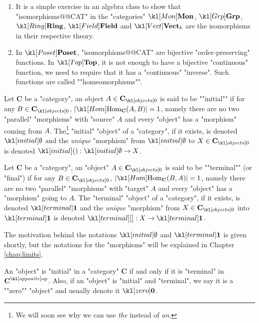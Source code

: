 \documentclass[main.tex]{subfiles}
\begin{document}
\begin{exmps}
	\begin{enumerate}
		\item It is a simple exercise in an algebra class to show that "isomorphisms@@CAT" in the "categories" $\catMon$, $\catGrp$, $\catRing$, $\catField$ and $\catVect{k}$ are the isomorphisms in their respective theory.
		\item In $\catPoset$, "isomorphisms@@CAT" are bijective "order-preserving" functions.
		\itemAP In $\catTop$, it is not enough to have a bijective "continuous" function, we need to require that it has a "continuous" "inverse". Such functions are called ""homeomorphisms"". %
	\end{enumerate}
\end{exmps}
\begin{defn}
	\AP Let $\mathbf{C}$ be a "category", an object $A \in \obj{\mathbf{C}}$ is said to be ""initial"" if for any $B \in \obj{\mathbf{C}}$, $|\Hom_{\mathbf{C}}(A,B)| = 1$, namely there are no two "parallel" "morphisms" with "source" $A$ and every "object" has a "morphism" coming from $A$. The\footnote{We will soon see why we can use \textit{the} instead of \textit{an}.} "initial" "object" of a "category", if it exists, is denoted $\initial$ and the \textit{unique} "morphism" from $\initial$ to $X\in \obj{\mathbf{C}}$ is denoted $\initmorph: \initial \rightarrow X$.
\end{defn}
\begin{defn}
	\AP Let $\mathbf{C}$ be a "category", an "object" $A \in \obj{\mathbf{C}}$ is said to be ""terminal"" (or "final") if for any $B \in \obj{\mathbf{C}}$, $|\Hom_{\mathbf{C}}(B,A)| = 1$, namely there are no two "parallel" "morphisms" with "target" $A$ and every "object" has a "morphism" going to $A$. The "terminal" "object" of a "category", if it exists, is denoted $\terminal$ and the \textit{unique} "morphism" from $X \in \obj{\mathbf{C}}$ into $\terminal$ is denoted $\termmorph:X \rightarrow \terminal$.
\end{defn}
\begin{rem}[Notation]
	The motivation behind the notations $\initial$ and $\terminal$ is given shortly, but the notations for the "morphisms" will be explained in Chapter \ref{chap:limits}.
\end{rem}
An "object" is "initial" in a "category" $\mathbf{C}$ if and only if it is "terminal" in $\op{\mathbf{C}}$. \AP Also, if an "object" is "initial" and "terminal", we say it is a ""zero"" "object" and usually denote it $\zero$.
\end{document}
